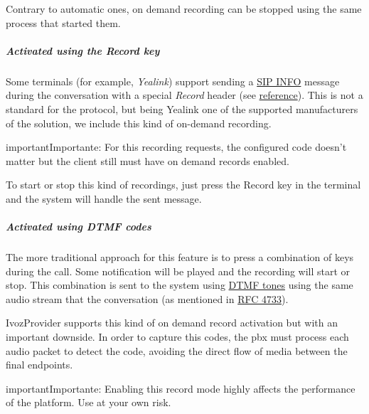 \documentclass[letterpaper,10pt,spanish]{sphinxmanual}
\begin{document}
Contrary to automatic ones, on demand recording can be stopped using the same
process that started them.


\subparagraph{Activated using the \emph{Record} key}
\label{administration_portal/client/residential/calls/call_recordings:activated-using-the-record-key}
Some terminals (for example, \emph{Yealink}) support sending a \href{https://tools.ietf.org/html/rfc6086}{SIP INFO} message during the conversation with a
special \emph{Record} header (see \href{http://www.yealink.com/Upload/document/UsingCallRecordingFeatureonYealinkPhones/UsingCallRecordingFeatureonYealinkSIPT2XPphonesRev\_610-20561729764.pdf}{reference}).
This is not a standard for the protocol, but being Yealink one of the supported
manufacturers of the solution, we include this kind of on-demand recording.

\begin{notice}{important}{Importante:}
For this recording requests, the configured code doesn't matter
but the client still must have on demand records enabled.
\end{notice}

To start or stop this kind of recordings, just press the Record key in the
terminal and the system will handle the sent message.


\subparagraph{Activated using \emph{DTMF} codes}
\label{administration_portal/client/residential/calls/call_recordings:activated-using-dtmf-codes}
The more traditional approach for this feature is to press a combination of
keys during the call. Some notification will be played and the recording will
start or stop. This combination is sent to the system using \href{https://es.wikipedia.org/wiki/Marcaci\%C3\%B3n\_por\_tonos}{DTMF tones} using the same audio
stream that the conversation (as mentioned in \href{https://tools.ietf.org/html/rfc4733}{RFC 4733}).

IvozProvider supports this kind of on demand record activation but with an
important downside. In order to capture this codes, the pbx must process each
audio packet to detect the code, avoiding the direct flow of media between the
final endpoints.

\begin{notice}{important}{Importante:}
Enabling this record mode highly affects the performance of the
platform. Use at your own risk.
\end{notice}
\end{document}
